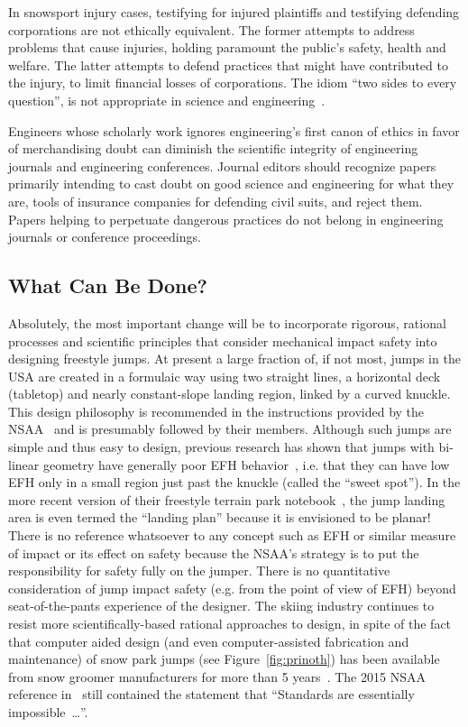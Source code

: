 \documentclass[smallextended]{svjour3}       %
\begin{document}
In snowsport injury cases, testifying for injured plaintiffs and testifying defending
corporations are not ethically equivalent. The former attempts to address
problems that cause injuries, holding paramount the public's safety, health and
welfare. The latter attempts to defend practices that might have contributed to
the injury, to limit financial losses of corporations. The idiom ``two sides to
every question'', is not appropriate in science and engineering~\cite[page
268]{Oreskes2010}.

Engineers whose scholarly work ignores engineering's first canon of ethics in
favor of merchandising doubt can diminish the scientific integrity of
engineering journals and engineering conferences. Journal editors should
recognize papers primarily intending to cast doubt on good science and
engineering for what they are, tools of insurance companies for defending civil
suits, and reject them. Papers helping to perpetuate dangerous practices do not
belong in engineering journals or conference proceedings.

\subsection{What Can Be Done?}
\label{sec:action}
%
Absolutely, the most important change will be to incorporate rigorous,
rational  processes and scientific principles that consider mechanical impact safety into designing freestyle jumps.
At present a large fraction of, if not most, jumps in the USA are created in a
formulaic way using two straight lines, a horizontal deck (tabletop) and nearly
constant-slope landing region, linked by a curved knuckle. This design philosophy is recommended in the instructions provided by the NSAA~\cite{NSAA2015} and is presumably followed by their members. Although such jumps are
simple and thus easy to design, previous research has shown that jumps with
bi-linear geometry have generally poor EFH behavior~\cite{Swedberg2012}, i.e. that they can have low EFH only in a small region just past the knuckle (called the ``sweet spot''). In the more recent version of their freestyle terrain park notebook~\cite{NSAA2015}, the jump landing area is even termed the ``landing plan'' because it is envisioned to be planar! There is no reference whatsoever to any concept such as EFH or similar measure of impact or its effect on safety because the NSAA's strategy is to put the responsibility for safety fully on the jumper. There is no
quantitative consideration of jump impact safety (e.g. from the point of view of EFH)
beyond seat-of-the-pants experience of the designer. The
skiing industry continues to resist more scientifically-based rational approaches to design, in spite of the fact that computer aided design (and even computer-assisted fabrication and maintenance) of snow park jumps (see
Figure~\ref{fig:prinoth}) has been available from snow groomer manufacturers
for more than 5 years~\cite{Muigg2019}. The 2015 NSAA reference in~\cite{NSAA2015} still contained the statement that ``Standards are essentially impossible~\ldots''.
\end{document}
